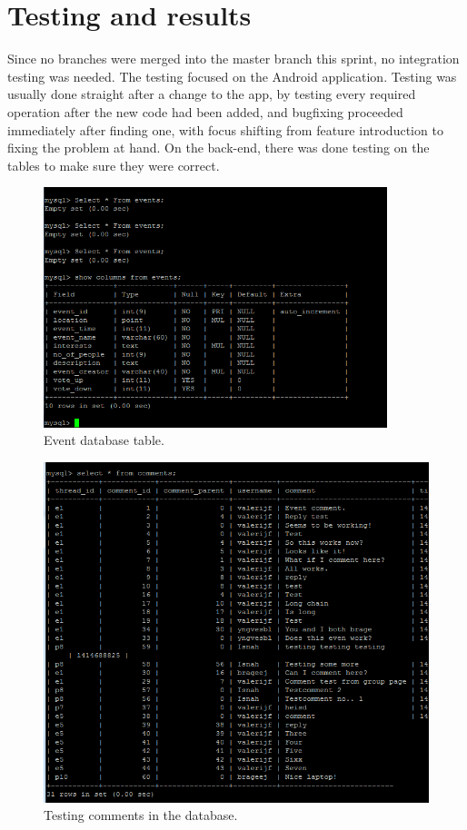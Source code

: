 \section{Testing and results}
\label{sec:S4Testing}

Since no branches were merged into the master branch this sprint, no integration testing was needed. The testing focused on the Android application. Testing was usually done straight after a change to the app, by testing every required operation after the new code had been added, and bugfixing proceeded immediately after finding one, with focus shifting from feature introduction to fixing the problem at hand. On the back-end, there was done testing on the tables to make sure they were correct.

\begin{figure}
    \centering
    \includegraphics[width=100mm]{./Sprint4/img/eventTable}
    \caption{Event database table.}
    \label{fig:S4TestingEvent}
\end{figure}

\begin{figure}
    \centering
    \includegraphics[width=\linewidth]{./Sprint4/img/commentsDB}
    \caption{Testing comments in the database.}
    \label{fig:S4TestingComments}
\end{figure}

